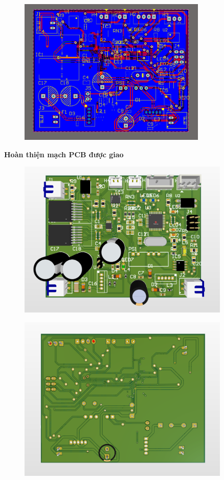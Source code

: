 \begin{figure}[H]
    \centering
    \includegraphics[width=0.8\textwidth]{pictures/7k.png}
\end{figure}
\cleardoublepage
\textbf{Hoàn thiện mạch PCB được giao}
\begin{figure}[H]
    \centering
    \includegraphics[width=0.9\textwidth]{pictures/7l.png}
\end{figure}
\begin{figure}[H]
    \centering
    \includegraphics[width=0.9\textwidth]{pictures/7m.png}
\end{figure}

